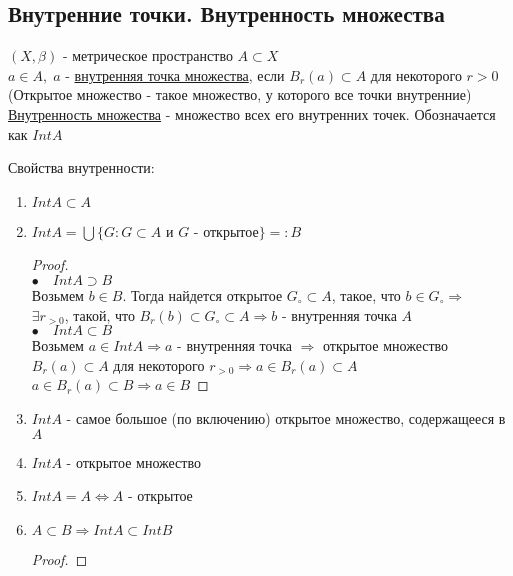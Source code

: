 \subsection{Внутренние точки. Внутренность множества}
\begin{conj}
    $(X, \beta)$ - метрическое пространство $A \subset X$ \\
    $a \in A, \; a$ - \underline{внутренняя точка множества}, если $B_r(a) \subset A$ для некоторого $r > 0$
    (Открытое множество - такое множество, у которого все точки внутренние) \\
    \underline{Внутренность множества} - множество всех его внутренних точек. Обозначается как $Int A$ \\
\end{conj}
\begin{theorem-non}
    Свойства внутренности: 
    \begin{enumerate}
        \item $Int A \subset A$
        \item $Int A = \bigcup \{G: G \subset A $ и $G$ - открытое$\} =: B$
        \begin{proof}
            \quad \\
            $\bullet \quad Int A \supset B$ \\
            Возьмем $b \in B$. Тогда найдется открытое $G_{\circ} \subset A$, такое, что $b \in G_{\circ} \Longrightarrow$\\
            $\exists r_{>0}$, такой, что $B_r(b) \subset G_{\circ} \subset A \Longrightarrow b$ - внутренняя точка $A$ \\
            $\bullet \quad Int A \subset B$ \\
            Возьмем $a \in Int A \Longrightarrow a$ - внутренняя точка $\Longrightarrow $ открытое множество $ B_r(a) \subset A$ для некоторого $r_{>0}
            \Longrightarrow a \in B_r(a) \subset A$ \\
            $a \in B_r(a) \subset B \Longrightarrow a \in B$
        \end{proof}
        \item $Int A$ - самое большое (по включению) открытое множество, содержащееся в $A$
        \item $Int A$ - открытое множество
        \item $Int A = A \Longleftrightarrow A$ - открытое 
        \item $A \subset B \Longrightarrow Int A \subset Int B$
        \begin{proof}

\end{proof}
\end{enumerate}
\end{theorem-non}
